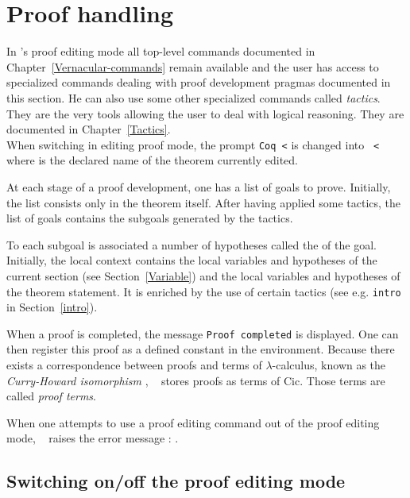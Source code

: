 \chapter[Proof handling]{Proof handling
\label{Proof-handling}}

In \Coq's proof editing mode all top-level commands documented in 
Chapter~\ref{Vernacular-commands} remain available
and the user has access to specialized commands dealing with proof
development pragmas documented in this section. He can also use some
other specialized commands called {\em tactics}.  They are the very
tools allowing the user to deal with logical reasoning. They are
documented in Chapter~\ref{Tactics}.\\ 
When switching in editing proof mode, the prompt
{\tt Coq <} is changed into {\tt {\ident} <} where {\ident} is the
declared name of the theorem currently edited.

At each stage of a proof development, one has a list of goals to
prove. Initially, the list consists only in the theorem itself. After
having applied some tactics, the list of goals contains the subgoals
generated by the tactics.

To each subgoal is associated  a number of
hypotheses called the {\em {}} of the goal.
Initially, the local context contains the local variables and
hypotheses of the current section (see Section~\ref{Variable}) and the
local variables and hypotheses of the theorem statement.  It is
enriched by the use of certain tactics (see e.g. {\tt intro} in
Section~\ref{intro}).

When a proof is completed, the message {\tt Proof completed} is
displayed. One can then register this proof as a defined constant in the
environment. Because there exists a correspondence between proofs and
terms of $\lambda$-calculus, known as the {\em Curry-Howard
isomorphism} \cite{How80,Bar91,Gir89,Hue89}, \Coq~ stores proofs as
terms of {\sc Cic}. Those terms are called {\em proof
  terms}.

\ErrMsg When one attempts to use a proof editing command out of the
proof editing mode, \Coq~ raises the error message : .

\section{Switching on/off the proof editing mode}

